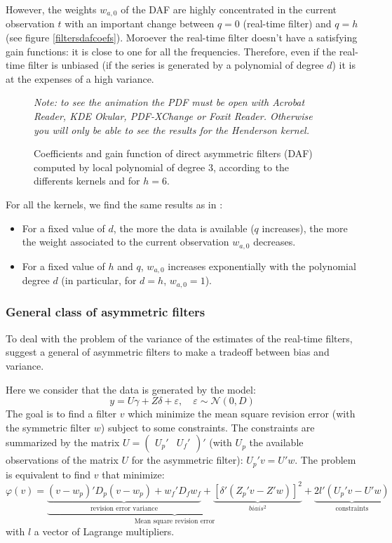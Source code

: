\documentclass[
  12pt,
  ,
  a4paper]{article}
\newcommand\1{\mathds{1}}
\begin{document}
However, the weights \(w_{a,0}\) of the DAF are highly concentrated in the current observation \(t\) with an important change between \(q=0\) (real-time filter) and \(q=h\) (see figure \ref{filtersdafcoefs}).
Moroever the real-time filter doesn't have a satisfying gain functions: it is close to one for all the frequencies.
Therefore, even if the real-time filter is unbiased (if the series is generated by a polynomial of degree \(d\)) it is at the expenses of a high variance.

\begin{figure}[!ht]
\caption{Coefficients and gain function of direct asymmetric filters (DAF) computed by local polynomial of degree $3$, according to the differents kernels and for $h=6$.}\label{fig:filtersdafcoefs}\footnotesize
\emph{Note: to see the animation the PDF must be open with Acrobat Reader, KDE Okular, PDF-XChange or Foxit Reader.
Otherwise you will only be able to see the results for the Henderson kernel.}
\end{figure}

For all the kernels, we find the same results as in \textcite{proietti2008}:

\begin{itemize}
\item
  For a fixed value of \(d\), the more the data is available (\(q\) increases), the more the weight associated to the current observation \(w_{a,0}\) decreases.
\item
  For a fixed value of \(h\) and \(q\), \(w_{a,0}\) increases exponentially with the polynomial degree \(d\) (in particular, for \(d=h\), \(w_{a,0}=1\)).
\end{itemize}

\hypertarget{general-class-of-asymmetric-filters}{%
\subsubsection{General class of asymmetric filters}\label{general-class-of-asymmetric-filters}}

To deal with the problem of the variance of the estimates of the real-time filters, \textcite{proietti2008} suggest a general of asymmetric filters to make a tradeoff between bias and variance.

Here we consider that the data is generated by the model:
\[
y=U\gamma+Z\delta+\varepsilon,\quad
\varepsilon\sim\mathcal{N}(0,D)
\]
The goal is to find a filter \(v\) which minimize the mean square revision error (with the symmetric filter \(w\)) subject to some constraints.
The constraints are summarized by the matrix \(U=\begin{pmatrix}U_{p}'&U_{f}'\end{pmatrix}'\) (with \(U_p\) the available observations of the matrix \(U\) for the asymmetric filter): \(U_p'v=U'w\).
The problem is equivalent to find \(v\) that minimize:
\[
\varphi(v)=
\underbrace{
  \underbrace{(v-w_{p})'D_{p}(v-w_{p})+
  w_{f}'D_{f}w_{f}}_\text{revision error variance}+
  \underbrace{[\delta'(Z_{p}'v-Z'w)]^{2}}_{biais^2}
}_\text{Mean square revision error}+
\underbrace{2l'(U_{p}'v-U'w)}_{\text{constraints}}
\]
with \(l\) a vector of Lagrange multipliers.
\end{document}
